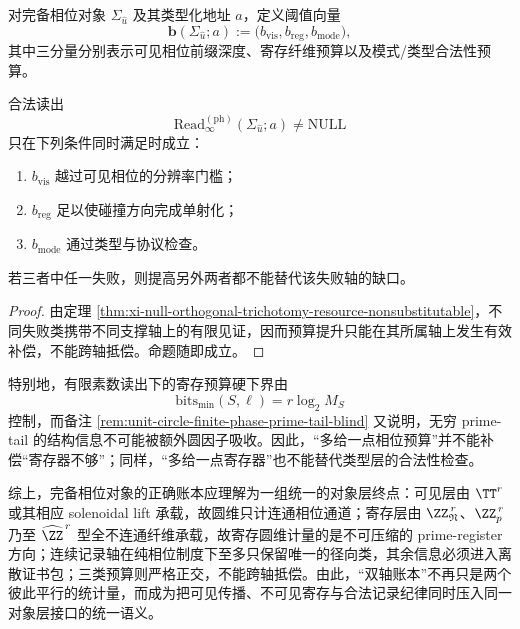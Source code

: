 \begin{definition}[正交阈值向量]\label{def:unit-circle-complete-phase-ledger-threshold-vector}
对完备相位对象 \(\Sigma_{\hat u}\) 及其类型化地址 \(a\)，定义阈值向量
\[
\mathbf b(\Sigma_{\hat u};a)
:=
\bigl(
b_{\mathrm{vis}},
b_{\mathrm{reg}},
b_{\mathrm{mode}}
\bigr),
\]
其中三分量分别表示可见相位前缀深度、寄存纤维预算以及模式/类型合法性预算。
\end{definition}

\begin{proposition}[预算不可互偿]\label{prop:unit-circle-complete-phase-budget-orthogonal}
合法读出
\[
\mathrm{Read}^{(\mathrm{ph})}_{\infty}(\Sigma_{\hat u};a)\neq \mathrm{NULL}
\]
只在下列条件同时满足时成立：
\begin{enumerate}
  \item \(b_{\mathrm{vis}}\) 越过可见相位的分辨率门槛；
  \item \(b_{\mathrm{reg}}\) 足以使碰撞方向完成单射化；
  \item \(b_{\mathrm{mode}}\) 通过类型与协议检查。
\end{enumerate}
若三者中任一失败，则提高另外两者都不能替代该失败轴的缺口。
\end{proposition}
\begin{proof}
由定理 \ref{thm:xi-null-orthogonal-trichotomy-resource-nonsubstitutable}，不同失败类携带不同支撑轴上的有限见证，因而预算提升只能在其所属轴上发生有效补偿，不能跨轴抵偿。命题随即成立。
\end{proof}

特别地，有限素数读出下的寄存预算硬下界由
\[
\mathrm{bits}_{\min}(S,\boldsymbol\ell)=r\log_2 M_S
\]
控制，而备注 \ref{rem:unit-circle-finite-phase-prime-tail-blind} 又说明，无穷 prime-tail 的结构信息不可能被额外圆因子吸收。因此，“多给一点相位预算”并不能补偿“寄存器不够”；同样，“多给一点寄存器”也不能替代类型层的合法性检查。

综上，完备相位对象的正确账本应理解为一组统一的对象层终点：可见层由 \(\TT^r\) 或其相应 solenoidal lift 承载，故圆维只计连通相位通道；寄存层由 \(\ZZ_{\mathfrak N}^{\,r}\)、\(\ZZ_p^{\,r}\) 乃至 \(\widehat{\ZZ}^{\,r}\) 型全不连通纤维承载，故寄存圆维计量的是不可压缩的 prime-register 方向；连续记录轴在纯相位制度下至多只保留唯一的径向类，其余信息必须进入离散证书包；三类预算则严格正交，不能跨轴抵偿。由此，“双轴账本”不再只是两个彼此平行的统计量，而成为把可见传播、不可见寄存与合法记录纪律同时压入同一对象层接口的统一语义。
